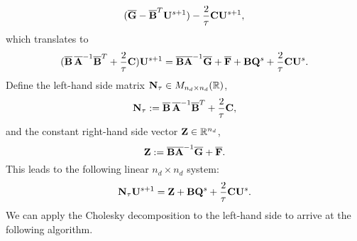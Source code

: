 \begin{discussion}
\begin{equation}
      (\overline{\bf G} - \overline{\bf B}^T {\bf U}^{s + 1})
      - \frac{2}{\tau} {\bf C} {\bf U}^{s + 1},
  \end{equation}
  which translates to
  \begin{equation}
    (\overline{\bf B}\, \overline{\bf A}^{-1} \overline{\bf B}^T
      + \frac{2}{\tau} {\bf C}) {\bf U}^{s + 1}
    = \overline{\bf B} \overline{\bf A}^{-1} \overline{\bf G}
      + \overline{\bf F} + {\bf B} {\bf Q}^s + \frac{2}{\tau} {\bf C} {\bf U}^s.
  \end{equation}
  Define the left-hand side matrix ${\bf N}_\tau \in M_{n_d \times n_d}(\mathbb{R})$,
  \begin{equation}
    {\bf N}_\tau
    := \overline{\bf B}\, \overline{\bf A}^{-1} \overline{\bf B}^T
      + \frac{2}{\tau} {\bf C},
  \end{equation}
  and the constant right-hand side vector ${\bf Z} \in \mathbb{R}^{n_d}$,
  \begin{equation}
    {\bf Z}
    := \overline{\bf B} \overline{\bf A}^{-1} \overline{\bf G}
      + \overline{\bf F}.
  \end{equation}
  This leads to the following linear $n_d \times n_d$ system:
  \begin{equation}
    {\bf N}_\tau {\bf U}^{s + 1}
    = {\bf Z} + {\bf B} {\bf Q}^s + \frac{2}{\tau} {\bf C} {\bf U}^s.
  \end{equation}
  We can apply the Cholesky decomposition to the left-hand side to arrive at
  the following algorithm.
\end{discussion}

